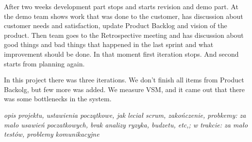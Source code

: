 After two weeks development part stops and starts revision and demo part. At the demo team shows work that was done to the customer, has discussion about customer needs and satisfaction, update Product Backlog and vision of the product. Then team goes to the Retrospective meeting and has discussion about good things and bad things that happened in the last sprint and what improvement should be done. In that moment first iteration stops. And second starts from planning again.

In this project there was three iterations. We don't finish all items from Product Backolg, but few more was added. We measure VSM, and it came out that there was some bottlenecks in the system. 

\textit{opis projektu, ustawienia początkowe, jak leciał scrum, zakończenie, probkemy: za mało usawień poczatkowych, brak analizy ryzyka, budzetu, etc,; w trakcie: za mało testów, problemy komunikacyjne}